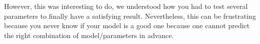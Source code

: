 \documentclass[12pt]{article}
\begin{document}
However, this was interesting to do, we understood how you had to test several parameters to finally have a satisfying result. Nevertheless, this can be frustrating because you never know if your model is a good one because one cannot predict the right combination of model/parameters in advance.

\newpage



\end{document}
